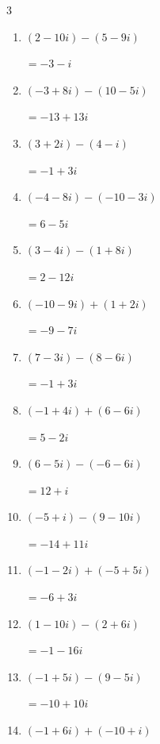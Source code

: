 \begin{multicols}{3}
\begin{enumerate}
  \item $\displaystyle (2-10i) - (5-9i)$

        $\displaystyle =-3-i$

  \item $\displaystyle (-3+8i) - (10-5i)$

        $\displaystyle =-13+13i$

  \item $\displaystyle (3+2i) - (4-i)$

        $\displaystyle =-1+3i$

  \item $\displaystyle (-4-8i) - (-10-3i)$

        $\displaystyle =6-5i$

  \item $\displaystyle (3-4i) - (1+8i)$

        $\displaystyle =2-12i$

  \item $\displaystyle (-10-9i) + (1+2i)$

        $\displaystyle =-9-7i$

  \item $\displaystyle (7-3i) - (8-6i)$

        $\displaystyle =-1+3i$

  \item $\displaystyle (-1+4i) + (6-6i)$

        $\displaystyle =5-2i$

  \item $\displaystyle (6-5i) - (-6-6i)$

        $\displaystyle =12+i$

  \item $\displaystyle (-5+i) - (9-10i)$

        $\displaystyle =-14+11i$

  \item $\displaystyle (-1-2i) + (-5+5i)$

        $\displaystyle =-6+3i$

  \item $\displaystyle (1-10i) - (2+6i)$

        $\displaystyle =-1-16i$

  \item $\displaystyle (-1+5i) - (9-5i)$

        $\displaystyle =-10+10i$

  \item $\displaystyle (-1+6i) + (-10+i)$


\end{enumerate}
\end{multicols}
